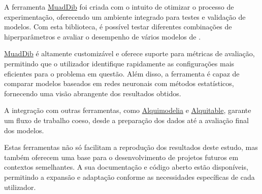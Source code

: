 A ferramenta \href{https://github.com/alquimodelia/MuadDib}{MuadDib} foi criada com o intuito de otimizar o processo de experimentação, oferecendo um ambiente integrado para testes e validação de modelos. Com esta biblioteca, é possível testar diferentes combinações de hiperparâmetros e avaliar o desempenho de vários modelos de . \par
\href{https://github.com/alquimodelia/MuadDib}{MuadDib} é altamente customizável e oferece suporte para métricas de avaliação, permitindo que o utilizador identifique rapidamente as configurações mais eficientes para o problema em questão. Além disso, a ferramenta é capaz de comparar modelos baseados em redes neuronais com métodos estatísticos, fornecendo uma visão abrangente dos resultados obtidos.\par
A integração com outras ferramentas, como \href{https://github.com/alquimodelia/alquimodelia}{Alquimodelia} e \href{https://github.com/alquimodelia/alquitable/blob/main/alquitable}{Alquitable}, garante um fluxo de trabalho coeso, desde a preparação dos dados até a avaliação final dos modelos. \par


\bigskip
Estas ferramentas não só facilitam a reprodução dos resultados deste estudo, mas também oferecem uma base para o desenvolvimento de projetos futuros em contextos semelhantes. A sua documentação e código aberto estão disponíveis, permitindo a expansão e adaptação conforme as necessidades específicas de cada utilizador. \par

